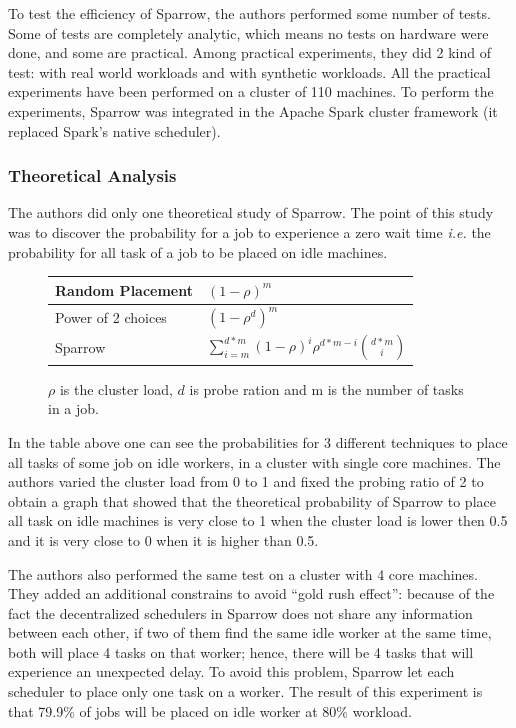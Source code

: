 \documentclass[11pt]{article}
\begin{document}
    	To test the efficiency of Sparrow, the authors performed some number of tests. Some of tests are completely analytic, which means no tests on hardware were done, and some are practical. Among practical experiments, they did 2 kind of test: with real world workloads and with synthetic workloads. All the practical experiments have been performed on a cluster of 110 machines. To perform the experiments, Sparrow was integrated in the Apache Spark cluster framework (it replaced Spark's native scheduler).


		\subsubsection*{Theoretical Analysis}
        
        	The authors did only one theoretical study of Sparrow. The point of this study was to discover the probability for a job to experience a zero wait time \textit{i.e.} the probability for all task of a job to be placed on idle machines.
            
            \begin{figure}[H]
            	\centering
                \begin{tabular}{ | l | l |}
                    \hline
                    Random Placement & $(1-\rho)^m$  \\ \hline
                    Power of 2 choices & $(1-\rho^d)^m$  \\ \hline
                    Sparrow & $\sum_{i=m}^{d*m}(1-\rho)^i$$\rho^{d*m-i}$${d*m}\choose{i}$ \\
                    \hline
                \end{tabular}
                \caption{$\rho$ is the cluster load, $d$ is probe ration and m is the number of tasks in a job.}
        	\end{figure}
            
            In the table above one can see the probabilities for 3 different techniques to place all tasks of some job on idle workers, in a cluster with single core machines. The authors varied the cluster load from 0 to 1 and fixed the probing ratio of 2 to obtain a graph that showed that the theoretical probability of Sparrow to place all task on idle machines is very close to 1 when the cluster load is lower then 0.5 and it is very close to 0 when it is higher than 0.5.
            
            The authors also performed the same test on a cluster with 4 core machines. They added an additional constrains to avoid ``gold rush effect'': because of the fact the decentralized schedulers in Sparrow does not share any information between each other, if two of them find the same idle worker at the same time, both will place 4 tasks on that worker; hence, there will be 4 tasks that will experience an unexpected delay. To avoid this problem, Sparrow let each scheduler to place only one task on a worker. The result of this experiment is that 79.9\% of jobs will be placed on idle worker at 80\% workload.
            
\end{document}
